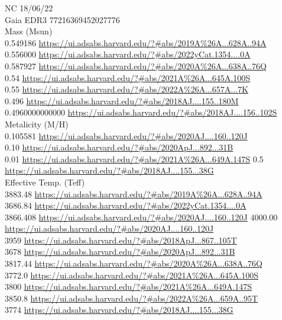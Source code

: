 NC 18/06/22\\
Gaia EDR3 77216369452027776\\
Mass (Msun)\\
0.549186 \url{https://ui.adsabs.harvard.edu/?#abs/2019A%26A...628A..94A}\\
0.556000 \url{https://ui.adsabs.harvard.edu/?#abs/2022yCat.1354....0A}\\
0.587927 \url{https://ui.adsabs.harvard.edu/?#abs/2020A%26A...638A..76Q}\\
0.54 \url{https://ui.adsabs.harvard.edu/?#abs/2021A%26A...645A.100S}\\
0.55 \url{https://ui.adsabs.harvard.edu/?#abs/2022A%26A...657A...7K}\\
0.496 \url{https://ui.adsabs.harvard.edu/?#abs/2018AJ....155..180M}\\
0.4960000000000 \url{https://ui.adsabs.harvard.edu/?#abs/2018AJ....156..102S}\\
Metalicity (M/H)\\
0.105581 \url{https://ui.adsabs.harvard.edu/?#abs/2020AJ....160..120J}\\
0.10 \url{https://ui.adsabs.harvard.edu/?#abs/2020ApJ...892...31B}\\
0.01 \url{https://ui.adsabs.harvard.edu/?#abs/2021A%26A...649A.147S}
0.5 \url{https://ui.adsabs.harvard.edu/?#abs/2018AJ....155...38G}\\
Effective Temp. (Teff)\\
3883.48 \url{https://ui.adsabs.harvard.edu/?#abs/2019A%26A...628A..94A}\\
3686.84 \url{https://ui.adsabs.harvard.edu/?#abs/2022yCat.1354....0A}\\
3866.408 \url{https://ui.adsabs.harvard.edu/?#abs/2020AJ....160..120J}
4000.00 \url{https://ui.adsabs.harvard.edu/?#abs/2020AJ....160..120J}\\
3959 \url{https://ui.adsabs.harvard.edu/?#abs/2018ApJ...867..105T}\\
3678 \url{https://ui.adsabs.harvard.edu/?#abs/2020ApJ...892...31B}\\
3817.44 \url{https://ui.adsabs.harvard.edu/?#abs/2020A%26A...638A..76Q}\\
3772.0 \url{https://ui.adsabs.harvard.edu/?#abs/2021A%26A...645A.100S}\\
3800 \url{https://ui.adsabs.harvard.edu/?#abs/2021A%26A...649A.147S}\\
3850.8 \url{https://ui.adsabs.harvard.edu/?#abs/2022A%26A...659A..95T}\\
3774 \url{https://ui.adsabs.harvard.edu/?#abs/2018AJ....155...38G}\\
